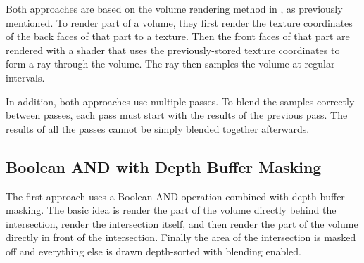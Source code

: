 \documentclass{article}
\begin{document}
Both approaches are based on the volume rendering method in \cite{Kruger03}, as
previously mentioned.  To render part of a volume, they first render the texture
coordinates of the back faces of that part to a texture.  Then the front faces
of that part are rendered with a shader that uses the previously-stored texture
coordinates to form a ray through the volume.  The ray then samples the volume
at regular intervals.

In addition, both approaches use multiple passes.  To blend the samples
correctly between passes, each pass must start with the results of the previous
pass.  The results of all the passes cannot be simply blended together
afterwards.

\subsection{Boolean AND with Depth Buffer Masking}

The first approach uses a Boolean AND operation combined with depth-buffer
masking.  The basic idea is render the part of the volume directly behind the
intersection, render the intersection itself, and then render the part of the
volume directly in front of the intersection.  Finally the area of the
intersection is masked off and everything else is drawn depth-sorted with
blending enabled.
\end{document}
